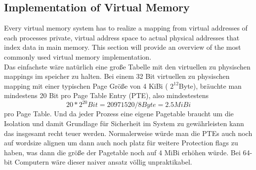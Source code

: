 
\subsection{Implementation of Virtual Memory}
Every virtual memory system has to realize a mapping from virtual addresses of each processes
private, virtual address space to actual physical addresses that index data in main memory.
This section will provide an overview of the most commonly used virtual memory implementation.\\

Das einfachste wäre natürlich eine große Tabelle mit den virtuellen zu physischen mappings im
speicher zu halten. Bei einem 32 Bit virtuellen zu physischen mapping mit einer typischen Page Größe
von 4 KiBi ( $ 2^{12}$Byte), bräuchte man mindestens 20 Bit pro Page Table Entry (PTE), also mindestestens
\[ 20 * 2^{20} Bit = 20971520 / 8 Byte = 2.5 MiBi \]
pro Page Table. Und da jeder Prozess eine eigene Pagetable braucht um die Isolation und damit Grundlage
für Sicherheit im System zu gewährleisten kann das insgesamt recht teuer werden.
Normalerweise würde man die PTEs auch noch auf wordsize alignen um dann auch noch platz für weitere
Protection flags zu haben, was dann die größe der Pagetable noch auf 4 MiBi erhöhen würde.
Bei 64-bit Computern wäre dieser naiver ansatz völlig unpraktikabel.
\\



